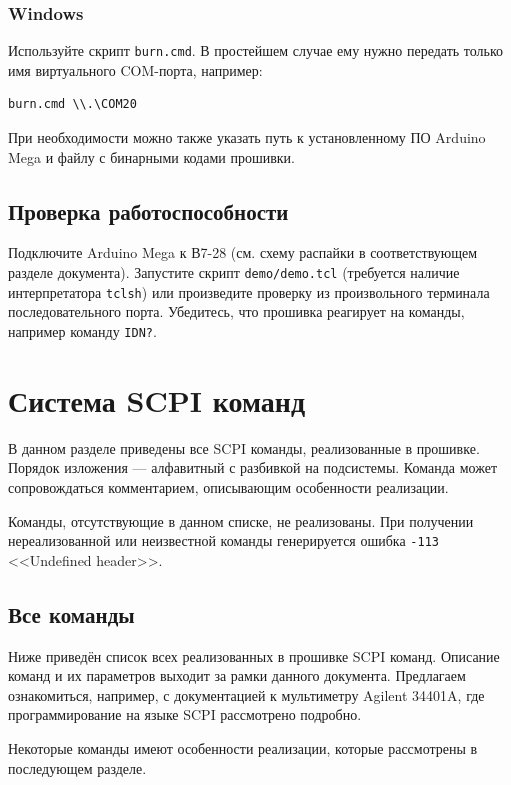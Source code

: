 \documentclass[12pt, a4paper]{article}
\newcommand{\SCPI}{\mbox{SCPI}}
\newcommand{\V}{\mbox{В7-28}}
\newcommand{\Arduino}{Arduino Mega}
\newcommand{\CMD}[1]{{\tt #1}}
\begin{document}
\subsubsection{Windows}

Используйте скрипт {\tt burn.cmd}. В простейшем случае ему нужно передать только имя виртуального COM-порта, например:

\begin{verbatim}
burn.cmd \\.\COM20
\end{verbatim}

При необходимости можно также указать путь к установленному ПО \Arduino{} и файлу с бинарными кодами прошивки.

\subsection{Проверка работоспособности}

Подключите \Arduino{} к \V{} (см. схему распайки в соответствующем разделе документа). Запустите скрипт {\tt demo/demo.tcl} (требуется наличие интерпретатора {\tt tclsh}) или произведите проверку из произвольного терминала последовательного порта. Убедитесь, что прошивка реагирует на команды, например команду \CMD{*IDN?}.

\section{Система SCPI команд}

В данном разделе приведены все \SCPI{} команды, реализованные в прошивке. Порядок изложения --- алфавитный с разбивкой на подсистемы. Команда может сопровождаться комментарием, описывающим особенности реализации.

Команды, отсутствующие в данном списке, не реализованы. При получении нереализованной или неизвестной команды генерируется ошибка \CMD{-113} <<Undefined header>>.

\subsection{Все команды}

Ниже приведён список  всех реализованных в прошивке SCPI команд. Описание команд и их параметров выходит за рамки данного документа. Предлагаем ознакомиться, например, с документацией к мультиметру Agilent 34401A, где программирование на языке SCPI рассмотрено подробно.

Некоторые команды имеют особенности реализации, которые рассмотрены в последующем разделе.
\end{document}
